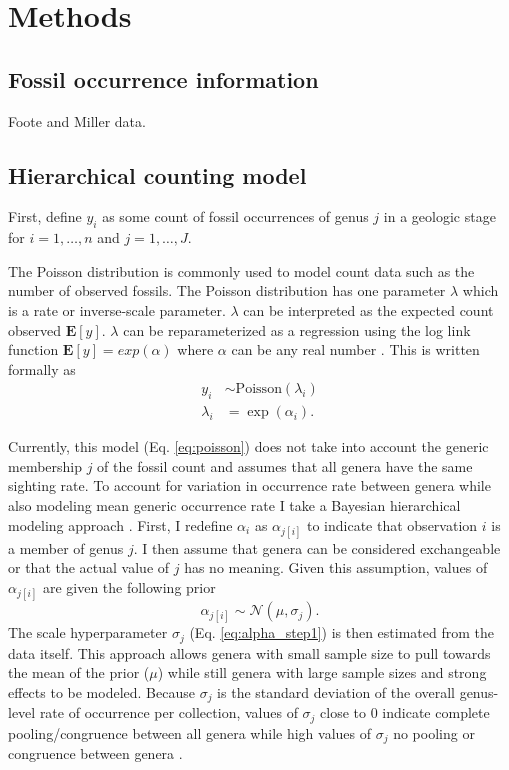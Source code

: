 \documentclass[12pt,letterpaper]{article}
\begin{document}
\section{Methods}

\subsection{Fossil occurrence information}
Foote and Miller data.

\subsection{Hierarchical counting model}
First, define \(y_{i}\) as some count of fossil occurrences of genus \(j\) in a geologic stage for \(i = 1, \dots, n\) and \(j = 1, \dots, J\).

The Poisson distribution is commonly used to model count data such as the number of observed fossils. The Poisson distribution has one parameter \(\lambda\) which is a rate or inverse-scale parameter. \(\lambda\) can be interpreted as the expected count observed \(\mathbf{E}[y]\). \(\lambda\) can be reparameterized as a regression using the log link function \(\mathbf{E}[y] = exp(\alpha)\) where \(\alpha\) can be any real number \citep{Gelman2007}. This is written formally as
\begin{align}
  y_{i} &\sim \mathrm{Poisson}(\lambda_{i}) \nonumber\\
  \lambda_{i} &= \exp(\alpha_{i}).
  \label{eq:poisson} 
\end{align}

Currently, this model (Eq. \ref{eq:poisson}) does not take into account the generic membership \(j\) of the fossil count and assumes that all genera have the same sighting rate. To account for variation in occurrence rate between genera while also modeling mean generic occurrence rate I take a Bayesian hierarchical modeling approach \citep{Gelman2007,Gelman2013b}. First, I redefine \(\alpha_{i}\) as \(\alpha_{j[i]}\) to indicate that observation \(i\) is a member of genus \(j\). I then assume that genera can be considered exchangeable or that the actual value of \(j\) has no meaning. Given this assumption, values of \(\alpha_{j[i]}\) are given the following prior 
\begin{equation}
  \alpha_{j[i]} \sim \mathcal{N}(\mu, \sigma_{j}).
  \label{eq:alpha_step1}
\end{equation}
The scale hyperparameter \(\sigma_{j}\) (Eq. \ref{eq:alpha_step1}) is then estimated from the data itself. This approach allows genera with small sample size to pull towards the mean of the prior (\(\mu\)) while still genera with large sample sizes and strong effects to be modeled. Because \(\sigma_{j}\) is the standard deviation of the overall genus-level rate of occurrence per collection, values of \(\sigma_{j}\) close to 0 indicate complete pooling/congruence between all genera while high values of \(\sigma_{j}\) no pooling or congruence between genera \citep{Gelman2013b}.
\end{document}
